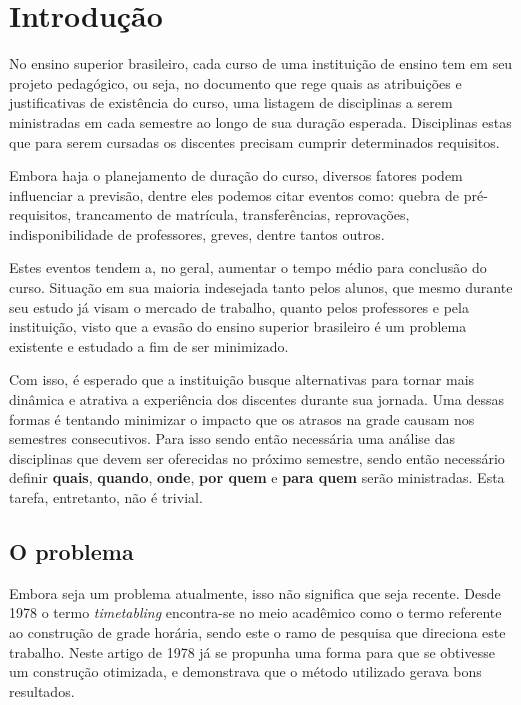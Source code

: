 \chapter{Introdução} \label{chap:introducao}             %

No ensino superior brasileiro, cada curso de uma instituição de ensino tem em seu projeto pedagógico, ou seja, no documento que rege quais as atribuições e justificativas de existência do curso, uma listagem de disciplinas a serem ministradas em cada semestre ao longo de sua duração esperada. Disciplinas estas que para serem cursadas os discentes precisam cumprir determinados requisitos.

Embora haja o planejamento de duração do curso, diversos fatores podem influenciar a previsão, dentre eles podemos citar eventos como: quebra de pré-requisitos, trancamento de matrícula, transferências, reprovações, indisponibilidade de professores, greves, dentre tantos outros.

Estes eventos tendem a, no geral, aumentar o tempo médio para conclusão do curso. Situação em sua maioria indesejada tanto pelos alunos, que mesmo durante seu estudo já visam o mercado de trabalho, quanto pelos professores e pela instituição, visto que a evasão do ensino superior brasileiro é um problema existente e estudado a fim de ser minimizado.

Com isso, é esperado que a instituição busque alternativas para tornar mais dinâmica e atrativa a experiência dos discentes durante sua jornada. Uma dessas formas é tentando minimizar o impacto que os atrasos na grade causam nos semestres consecutivos. Para isso sendo então necessária uma análise das disciplinas que devem ser oferecidas no próximo semestre, sendo então necessário definir \textbf{quais}, \textbf{quando}, \textbf{onde}, \textbf{por quem} e \textbf{para quem} serão ministradas. Esta tarefa, entretanto, não é trivial.

\section{O problema} \label{sec:Problemáticas}        %

Embora seja um problema atualmente, isso não significa que seja recente. Desde 1978 \cite{Barham1978} o termo \textit{timetabling} encontra-se no meio acadêmico como o termo referente ao construção de grade horária, sendo este o ramo de pesquisa que direciona este trabalho. Neste artigo de 1978 já se propunha uma forma para que se obtivesse um construção otimizada, e demonstrava que o método utilizado gerava bons resultados.

